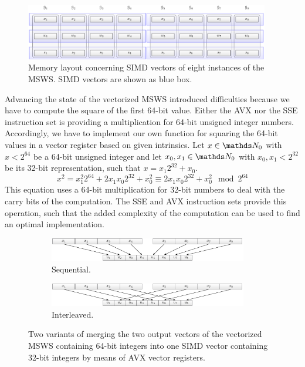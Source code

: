 \documentclass{stdlocal}
\begin{document}
    \begin{figure}
      \center
      \includegraphics[width=0.95\textwidth]{figures/msws_vector_layout.pdf}
      \caption[MSWS Vector Layout]{%
        Memory layout concerning SIMD vectors of eight instances of the MSWS.
        SIMD vectors are shown as blue box.
      }
      \label{fig:msws-vector-layout}
    \end{figure}

    Advancing the state of the vectorized MSWS introduced difficulties because we have to compute the square of the first 64-bit value.
    Either the AVX nor the SSE instruction set is providing a multiplication for 64-bit unsigned integer numbers.
    Accordingly, we have to implement our own function for squaring the 64-bit values in a vector register based on given intrinsics.
    Let $x\in\setNatural_0$ with $x < 2^{64}$ be a 64-bit unsigned integer and let $x_0,x_1\in\setNatural_0$ with $x_0,x_1 < 2^{32}$ be its 32-bit representation, such that $x = x_1 2^{32} + x_0$.
    \[
      x^2 = x_1^2 2^{64} + 2x_1x_0 2^{32} + x_0^2 \equiv 2x_1x_0 2^{32} + x_0^2 \mod 2^{64}
    \]
    This equation uses a 64-bit multiplication for 32-bit numbers to deal with the carry bits of the computation.
    The SSE and AVX instruction sets provide this operation, such that the added complexity of the computation can be used to find an optimal implementation.

    \begin{figure}
      \center
      \begin{subfigure}[b]{\textwidth}
        \center
        \includegraphics[width=0.95\textwidth]{figures/msws_merge.pdf}
        \caption{Sequential.}
      \end{subfigure}

      \begin{subfigure}[b]{\textwidth}
        \center
        \includegraphics[width=0.95\textwidth]{figures/msws_merge2.pdf}
        \caption{Interleaved.}
      \end{subfigure}
      \caption[MSWS Vector Merge Scheme]{%
        Two variants of merging the two output vectors of the vectorized MSWS containing 64-bit integers into one SIMD vector containing 32-bit integers by means of AVX vector registers.
      }
      \label{fig:msws-vector-merge-scheme}
    \end{figure}
\end{document}
